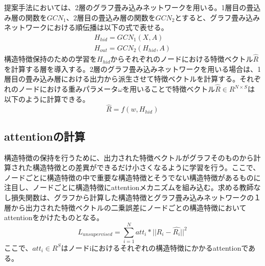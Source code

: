 提案手法においては、2層のグラフ畳み込みネットワークを用いる。1層目の畳込み層の関数を$GCN_1$、2層目の畳込み層の関数を$GCN_2$とすると、グラフ畳み込みネットワークにおける順伝播は以下の式で表せる。\\
\begin{eqnarray}
H_{hid} = GCN_1(X,A)\\
H_{out}=GCN_2(H_{hid} , A)
\end{eqnarray}
構造特徴保持のための学習を$H_{hid}$からそれぞれのノードにおける特徴ベクトル$\hat{R}$を計算する層を導入する。2層のグラフ畳み込みネットワークを用いる場合は、1層目の畳み込み層における出力から派生させて特徴ベクトルを計算する。それぞれのノードにおける重みパラメータ{\bf $\omega$}を用いることで特徴ベクトル$\hat{R} \in R^{N\times S}$は以下のように計算できる。
\begin{equation}
\hat{R} = f(w, H_{hid})
\end{equation}

\subsection{attentionの計算}
構造特徴の保持を行うために、出力された特徴ベクトルがグラフそのものから計算された構造特徴との差異ができるだけ小さくなるように学習を行う。ここで、ノードごとに構造特徴の中で重要な構造特徴とそうでない構造特徴があるものに注目し、ノードごとに構造特徴にattentionメカニズムを組み込む。求める教師なし損失関数は、グラフから計算した構造特徴とグラフ畳み込みネットワークの１層から出力された特徴ベクトルの二乗誤差にノードごとの構造特徴においてattentionをかけたものとなる。
\begin{equation}
L_{unsupervised} = \sum_{i=1}^{N} att_i * ||R_{i} - \hat{R_{i}}||^{2}
\end{equation}
ここで、$att_i \in R^{S}$はノードiにおけるそれぞれの構造特徴にかかるattentionである。
